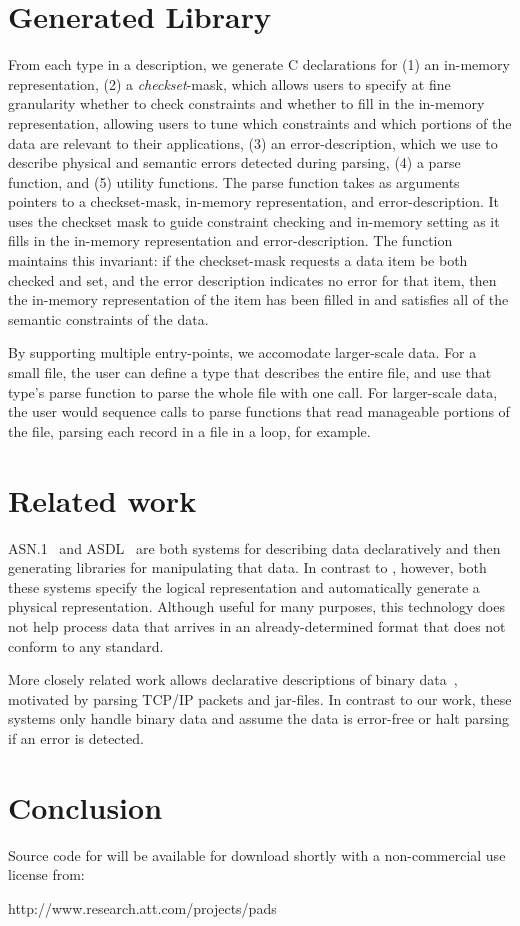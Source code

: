 \documentclass[10pt]{article}
\begin{document}
\section{Generated Library}
From each type in a \pads{} description, we generate C declarations for
(1) an in-memory representation, 
(2) a {\em checkset}\/-mask, which allows users to specify at fine granularity
whether to check constraints and whether to fill in the in-memory representation,
allowing users to tune which constraints and which portions of the data are relevant to their applications,
(3) an error-description, which we use to describe physical and
semantic errors detected during parsing, 
(4) a parse function, and 
(5) utility functions.
The parse function takes as arguments pointers to a checkset-mask, in-memory representation, and
error-description.  It uses the checkset mask to guide constraint checking and in-memory setting
as it fills in the in-memory representation and error-description.
The function maintains this invariant: if the checkset-mask
requests a data item be both checked and set, and the error description indicates no
error for that item, then the in-memory representation of the item has been filled in and
satisfies all of the semantic constraints of the data. 

By supporting multiple entry-points, we accomodate larger-scale data.
For a small file, the user can define a \padsl{} type that describes
the entire file, and use that type's parse function to parse the whole
file with one call.  For larger-scale data, the user would sequence
calls to parse functions that read manageable portions of the file,
parsing each record in a file in a loop, for example.

\section{Related work}
\textsc{ASN.1}~\cite{asn} and \textsc{ASDL}~\cite{asdl} are both
systems for describing data declaratively and then generating
libraries for manipulating that data.  In contrast to \pads{},
however, both these systems specify the logical representation and
automatically generate a physical representation.  Although useful for
many purposes, this technology does not help process data that arrives
in an already-determined format that does not conform to
any standard. 

More closely related work allows declarative descriptions of binary
data~\cite{sigcomm00,erlang-bit-syntax,gpce02}, motivated by parsing
\textsc{TCP/IP} packets and \java{} jar-files.  In contrast to our
work, these systems only handle binary data and assume the data is
error-free or halt parsing if an error is detected.  

\section{Conclusion}
Source code for \pads{} will be available for download shortly with
a non-commercial use license from: 
\begin{centercode}
http://www.research.att.com/projects/pads
\end{centercode}
 

\end{document}
